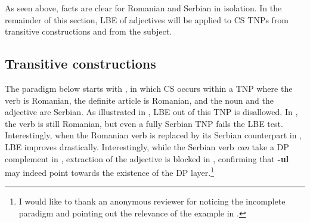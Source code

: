 \documentclass[output=paper,
hidelinks,
newtxmath,
]{langscibook}
\begin{document}
\ea \label{ex14x}
	\z
\z

\noindent As seen above, facts are clear for Romanian and Serbian in isolation. In the remainder of this section, LBE of adjectives will be applied to CS TNPs from transitive constructions and from the subject.

\subsection{Transitive constructions}\label{s5.2}

The paradigm below starts with , in which CS occurs within a TNP where the verb is Romanian, the definite article is Romanian, and the noun and the adjective are Serbian. As illustrated in , LBE out of this TNP is disallowed. In , the verb is still Romanian, but even a fully Serbian TNP fails the LBE test. Interestingly, when the Romanian verb is replaced by its Serbian counterpart in , LBE improves drastically. Interestingly, while the Serbian verb \textit{can} take a DP complement in , extraction of the adjective is blocked in , confirming that \textbf{-ul} may indeed point towards the existence of the DP layer.\footnote{\label{fn9}I would like to thank an anonymous reviewer for noticing the incomplete paradigm and pointing out the relevance of the example in .}

\ea \label{ex16}
	\z
\z
\end{document}
